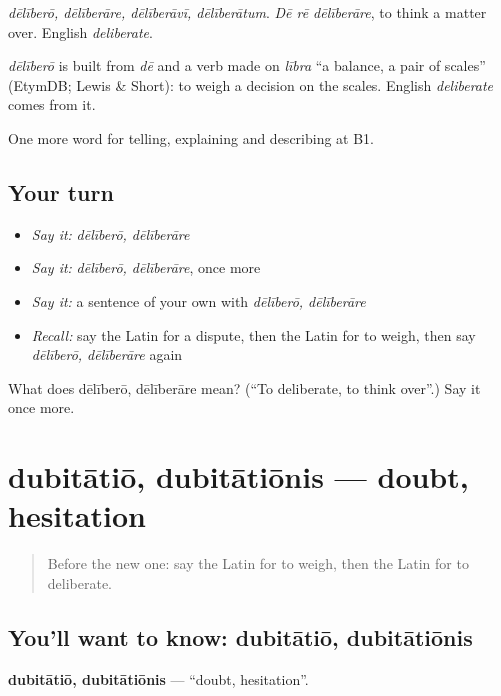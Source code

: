 \emph{dēlīberō, dēlīberāre, dēlīberāvī, dēlīberātum}. \emph{Dē rē dēlīberāre}, to think a matter over. English \emph{deliberate}.

\begin{cousinweb}
\emph{dēlīberō} is built from \emph{dē} and a verb made on \emph{lībra} \textquotedblleft{}a balance, a pair of scales\textquotedblright{} (EtymDB; Lewis \& Short): to weigh a decision on the scales. English \emph{deliberate} comes from it.
\end{cousinweb}

\begin{grammarlens}[title={What you've built}]
One more word for telling, explaining and describing at B1.
\end{grammarlens}

\subsection*{Your turn}
\begin{itemize}
\raggedright
  \item \emph{Say it:} \emph{dēlīberō, dēlīberāre}
  \item \emph{Say it:} \emph{dēlīberō, dēlīberāre}, once more
  \item \emph{Say it:} a sentence of your own with \emph{dēlīberō, dēlīberāre}
  \item \emph{Recall:} say the Latin for a dispute, then the Latin for to weigh, then say \emph{dēlīberō, dēlīberāre} again
\end{itemize}

\begin{tcolorbox}[breakable,colback=teal!4,colframe=teal!35!black,title={Before you move on}]
What does dēlīberō, dēlīberāre mean? (\textquotedblleft{}To deliberate, to think over\textquotedblright{}.) Say it once more.
\end{tcolorbox}
\section[dubitātiō, dubitātiōnis]{dubitātiō, dubitātiōnis — doubt, hesitation}

\label{lesson:LA-C359-dubitatio}



\begin{quote}
Before the new one: say the Latin for to weigh, then the Latin for to deliberate.
\end{quote}

\subsection*{You'll want to know: dubitātiō, dubitātiōnis}
\textbf{dubitātiō, dubitātiōnis} — \textquotedblleft{}doubt, hesitation\textquotedblright{}.

